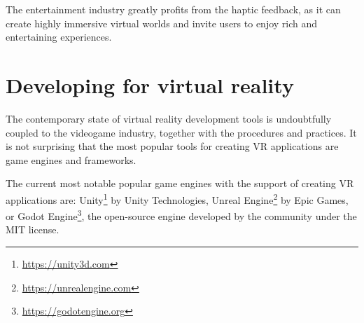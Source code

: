 The entertainment industry greatly profits from the haptic feedback, as it can
create highly immersive virtual worlds and invite users to enjoy rich 
and entertaining experiences.


\hypertarget{x-developing-for-virtual-reality}{\section{Developing for virtual reality}}
The contemporary state of virtual reality development tools is undoubtfully
coupled to the videogame industry, together with the procedures and practices.
It is not surprising that the most popular tools for creating
VR applications are game engines and frameworks.


The current most notable popular game engines with the support of creating VR
applications are: Unity\footnote{\href{https://unity3d.com}{https://unity3d.com}} by
Unity Technologies, Unreal Engine\footnote{\href{https://unrealengine.com}{https://unrealengine.com}} by
Epic Games, or Godot Engine\footnote{\href{https://godotengine.org}{https://godotengine.org}},
the open-source engine developed by the community under the MIT license.\,\cite{slantvr}
